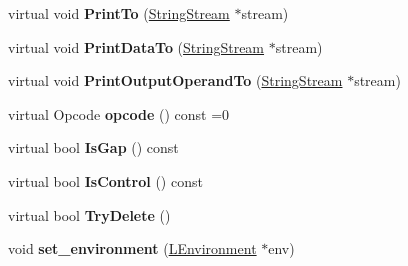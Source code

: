 \begin{DoxyCompactItemize}
\item 
virtual void {\bfseries Print\+To} (\hyperlink{classv8_1_1internal_1_1_string_stream}{String\+Stream} $\ast$stream)\hypertarget{classv8_1_1internal_1_1_l_instruction_a7fd3ca39e41f221d7dd97c947219770c}{}\label{classv8_1_1internal_1_1_l_instruction_a7fd3ca39e41f221d7dd97c947219770c}

\item 
virtual void {\bfseries Print\+Data\+To} (\hyperlink{classv8_1_1internal_1_1_string_stream}{String\+Stream} $\ast$stream)\hypertarget{classv8_1_1internal_1_1_l_instruction_a3e3375f04ff4ab46cd75200cfa1b918d}{}\label{classv8_1_1internal_1_1_l_instruction_a3e3375f04ff4ab46cd75200cfa1b918d}

\item 
virtual void {\bfseries Print\+Output\+Operand\+To} (\hyperlink{classv8_1_1internal_1_1_string_stream}{String\+Stream} $\ast$stream)\hypertarget{classv8_1_1internal_1_1_l_instruction_af5f97137ae7c1b7af3737b41c235f28f}{}\label{classv8_1_1internal_1_1_l_instruction_af5f97137ae7c1b7af3737b41c235f28f}

\item 
virtual Opcode {\bfseries opcode} () const  =0\hypertarget{classv8_1_1internal_1_1_l_instruction_aa0129e8a782b2dd3d9753986e3d245f1}{}\label{classv8_1_1internal_1_1_l_instruction_aa0129e8a782b2dd3d9753986e3d245f1}

\item 
virtual bool {\bfseries Is\+Gap} () const \hypertarget{classv8_1_1internal_1_1_l_instruction_a96115165585397545ac4945072c27dfc}{}\label{classv8_1_1internal_1_1_l_instruction_a96115165585397545ac4945072c27dfc}

\item 
virtual bool {\bfseries Is\+Control} () const \hypertarget{classv8_1_1internal_1_1_l_instruction_a2cc159f22c6519accebaa83d4e554dd7}{}\label{classv8_1_1internal_1_1_l_instruction_a2cc159f22c6519accebaa83d4e554dd7}

\item 
virtual bool {\bfseries Try\+Delete} ()\hypertarget{classv8_1_1internal_1_1_l_instruction_ae33f8094c99e0ec89bc4020a5de93187}{}\label{classv8_1_1internal_1_1_l_instruction_ae33f8094c99e0ec89bc4020a5de93187}

\item 
void {\bfseries set\+\_\+environment} (\hyperlink{classv8_1_1internal_1_1_l_environment}{L\+Environment} $\ast$env)\hypertarget{classv8_1_1internal_1_1_l_instruction_a151c380b67119265805b298e84f3f7db}{}\label{classv8_1_1internal_1_1_l_instruction_a151c380b67119265805b298e84f3f7db}


\end{DoxyCompactItemize}
